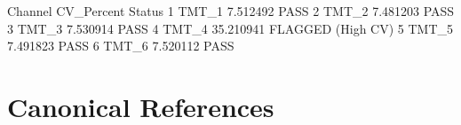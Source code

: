 \documentclass[11pt,oneside]{book}
\begin{document}
\begin{routput}
  Channel CV\_Percent            Status
1   TMT\_1   7.512492              PASS
2   TMT\_2   7.481203              PASS
3   TMT\_3   7.530914              PASS
4   TMT\_4  35.210941 FLAGGED (High CV)
5   TMT\_5   7.491823              PASS
6   TMT\_6   7.520112              PASS
\end{routput}

\section*{Canonical References}
\end{document}

